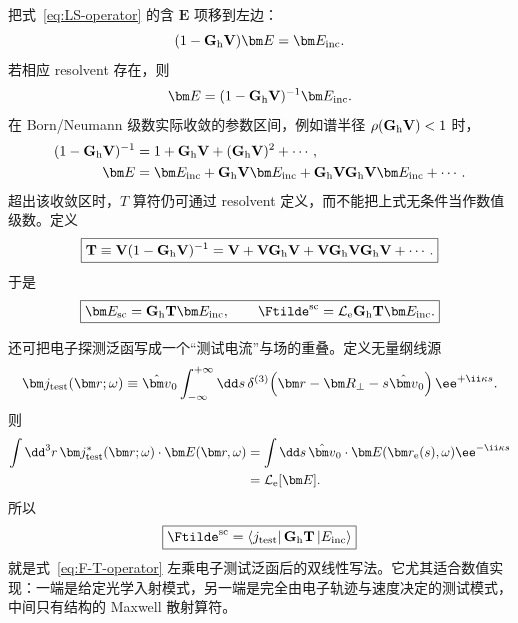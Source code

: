 把式~\eqref{eq:LS-operator} 的含 $\bm E$ 项移到左边：
\begin{equation}
(1-\mathbf G_{\rm h}\mathbf V)\bm E=\bm E_{\rm inc}.
\end{equation}
若相应 resolvent 存在，则
\begin{equation}
\bm E=(1-\mathbf G_{\rm h}\mathbf V)^{-1}\bm E_{\rm inc}.
\end{equation}
在 Born/Neumann 级数实际收敛的参数区间，例如谱半径 $\rho(\mathbf G_{\rm h}\mathbf V)<1$ 时，
\begin{align}
(1-\mathbf G_{\rm h}\mathbf V)^{-1}
&=1+\mathbf G_{\rm h}\mathbf V
+(\mathbf G_{\rm h}\mathbf V)^2+\cdots,\\
\bm E
&=\bm E_{\rm inc}
+\mathbf G_{\rm h}\mathbf V\bm E_{\rm inc}
+\mathbf G_{\rm h}\mathbf V\mathbf G_{\rm h}\mathbf V\bm E_{\rm inc}+\cdots.
\end{align}
超出该收敛区时，$T$ 算符仍可通过 resolvent 定义，而不能把上式无条件当作数值级数。定义
\begin{equation}
\boxed{
\mathbf T
\equiv\mathbf V(1-\mathbf G_{\rm h}\mathbf V)^{-1}
=\mathbf V+\mathbf V\mathbf G_{\rm h}\mathbf V
+\mathbf V\mathbf G_{\rm h}\mathbf V\mathbf G_{\rm h}\mathbf V+\cdots.}
\label{eq:T-operator}
\end{equation}
于是
\begin{equation}
\boxed{
\bm E_{\rm sc}=\mathbf G_{\rm h}\mathbf T\bm E_{\rm inc},
\qquad
\Ftilde^{\rm sc}=\mathcal L_{\rm e}\mathbf G_{\rm h}\mathbf T\bm E_{\rm inc}.}
\label{eq:F-T-operator}
\end{equation}

还可把电子探测泛函写成一个“测试电流”与场的重叠。定义无量纲线源
\begin{equation}
 \bm j_{\rm test}(\bm r;\omega)
 \equiv
 \hat{\bm v}_0
 \int_{-\infty}^{+\infty}\dd s\,
 \delta^{(3)}\!\left(\bm r-\bm R_\perp-s\hat{\bm v}_0\right)
 \ee^{+\ii\kappa s}.
 \label{eq:test-current}
\end{equation}
则
\begin{align}
\int\dd^3r\,
\bm j_{\rm test}^*(\bm r;\omega)\cdot\bm E(\bm r,\omega)
&=\int\dd s\,
\hat{\bm v}_0\cdot\bm E(\bm r_{\rm e}(s),\omega)
\ee^{-\ii\kappa s}\\
&=\mathcal L_{\rm e}[\bm E].
\end{align}
所以
\begin{equation}
 \boxed{
 \Ftilde^{\rm sc}
 =\langle j_{\rm test}|\,\mathbf G_{\rm h}\mathbf T\,|E_{\rm inc}\rangle}
 \label{eq:pinem-bilinear-scattering-form}
\end{equation}
就是式~\eqref{eq:F-T-operator} 左乘电子测试泛函后的双线性写法。它尤其适合数值实现：一端是给定光学入射模式，另一端是完全由电子轨迹与速度决定的测试模式，中间只有结构的 Maxwell 散射算符。

